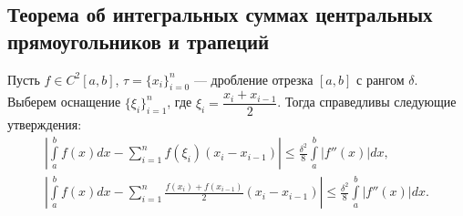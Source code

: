 \subsection{Теорема об интегральных суммах центральных прямоугольников и трапеций}

\hypertarget{trap}{}
\begin{theorem}
	Пусть \(f \in C^2 [a, b]\), \(\tau = \{x_i\}_{i = 0}^n\) --- дробление отрезка \([a, b]\) с рангом \(\delta\). Выберем оснащение \(\{\xi_i\}_{i = 1}^n\), где \(\xi_i = \dfrac{x_i + x_{i - 1}}{2}\). Тогда справедливы следующие утверждения:
	\begin{gather}
		\label{intsum1}
		\left|\int\limits_a^b f(x) dx - \sum_{i = 1}^n f(\xi_i) (x_i - x_{i - 1}) \right| \leqslant \frac{\delta^2}{8} \int\limits_a^b |f''(x)| dx, \\
		\label{intsum2}
		\left|\int\limits_a^b f(x) dx - \sum_{i = 1}^n \frac{f(x_i) + f(x_{i - 1})}{2} (x_i - x_{i - 1})\right| \leqslant \frac{\delta^2}{8} \int\limits_a^b |f''(x)| dx.
	\end{gather}
\end{theorem}


